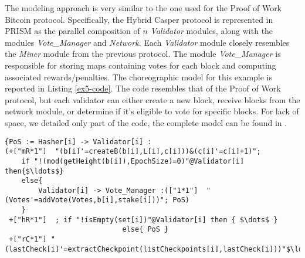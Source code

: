 The modeling approach is very similar to the one used for the Proof of Work Bitcoin protocol. Specifically, the Hybrid Casper protocol is represented in PRISM as the parallel composition of $n$ \emph{Validator} modules, along with the modules \emph{Vote\_Manager} and \emph{Network}. Each \emph{Validator} module closely resembles the \emph{Miner} module from the previous protocol. The module \emph{Vote\_Manager} is responsible for storing maps containing votes for each block and computing associated rewards/penalties.
The choreographic model for this example is reported in Listing \ref{ex5-code}. 
The code resembles that of the Proof of Work protocol, but each validator can either create a new block, receive blocks from the network module, or determine if it's eligible to vote for specific blocks.
For lack of space, we detailed only part of the code, the complete model can be found in \cite{repository}.
\begin{lstlisting}[style=chor-color,tabsize=2,breaklines=true, postbreak=\mbox{\textcolor{red}{$\hookrightarrow$}\space},	caption={Excerpt of the Hybrid Casper Protocol as a choreography},captionpos=b,label={ex5-code}]
{PoS := Hasher[i] -> Validator[i] :
(+["mR*1"]  "(b[i]'=createB(b[i],L[i],c[i]))&(c[i]'=c[i]+1)"; 
	if "!(mod(getHeight(b[i]),EpochSize)=0)"@Validator[i] then{$\ldots$}
	else{
		Validator[i] -> Vote_Manager :(["1*1"]  "(Votes'=addVote(Votes,b[i],stake[i]))"; PoS)
	}
 +["hR*1"]  ; if "!isEmpty(set[i])"@Validator[i] then { $\dots$ }
 							else{ PoS }
 +["rC*1"] "(lastCheck[i]'=extractCheckpoint(listCheckpoints[i],lastCheck[i]))"$\ldots$}

\end{lstlisting}

